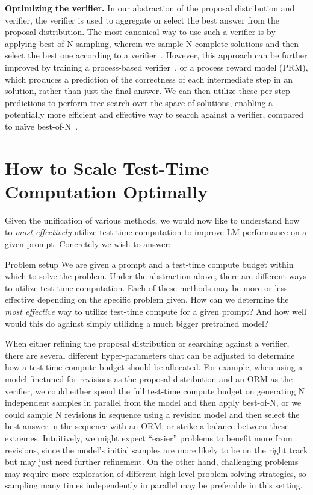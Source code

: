 \documentclass[11pt, letterpaper, logo]{googledeepmind}
\begin{document}
\textbf{Optimizing the verifier.} In our abstraction of the proposal distribution and verifier, the verifier is used to aggregate or select the best answer from the proposal distribution. The most canonical way to use such a verifier is by applying best-of-N sampling, wherein we sample N complete solutions and then select the best one according to a verifier~\citep{cobbe2021training}. However, this approach can be further improved by training a process-based verifier~\citep{lightman2023lets}, or a process reward model (PRM), which produces a prediction of the correctness of each intermediate step in an solution, rather than just the final answer. We can then utilize these per-step predictions to perform tree search over the space of solutions, enabling a potentially more efficient and effective way to search against a verifier, compared to na\"ive best-of-N~\citep{yao2023tree,feng2024alphazerolike,chen2024alphamath}.

\vspace{-0.25cm}
\section{How to Scale Test-Time Computation Optimally}
\label{sec:compute_optimal}
\vspace{-0.25cm}

Given the unification of various methods, we would now like to understand how to \emph{most effectively} utilize test-time computation to improve LM performance on a given prompt. Concretely we wish to answer:
\begin{AIbox}{Problem setup}
    We are given a prompt and a test-time compute budget within which to solve the problem. Under the abstraction above, there are different ways to utilize test-time computation. Each of these methods may be more or less effective depending on the specific problem given. How can we determine the \emph{most effective} way to utilize test-time compute for a given prompt? And how well would this do against simply utilizing a much bigger pretrained model?
\end{AIbox}
When either refining the proposal distribution or searching against a verifier, there are several different hyper-parameters that can be adjusted to determine how a test-time compute budget should be allocated. For example, when using a model finetuned for revisions as the proposal distribution and an ORM as the verifier, we could either spend the full test-time compute budget on generating N independent samples in parallel from the model and then apply best-of-N, or we could sample N revisions in sequence using a revision model and then select the best answer in the sequence with an ORM, or strike a balance between these extremes.
Intuitively, we might expect ``easier'' problems to benefit more from revisions, since the model's initial samples are more likely to be on the right track but may just need further refinement. On the other hand, challenging problems may require more exploration of different high-level problem solving strategies, so sampling many times independently in parallel may be preferable in this setting.
\end{document}
